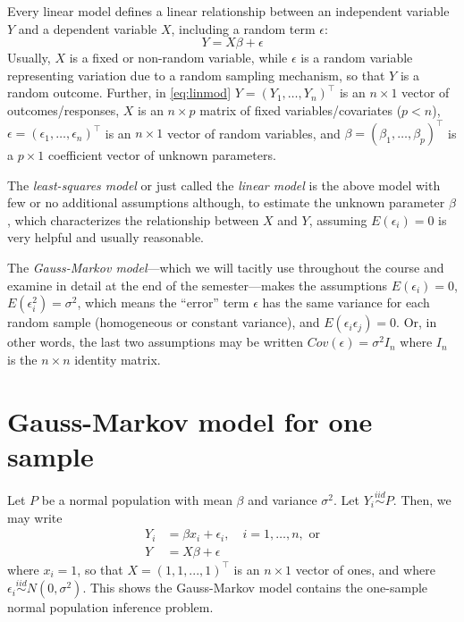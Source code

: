 \documentclass[
]{book}
\begin{document}
Every linear model defines a linear relationship between an independent variable \(Y\) and a dependent variable \(X\), including a random term \(\epsilon\):
\begin{equation}
Y = X\beta + \epsilon
  \label{eq:linmod}
\end{equation}
Usually, \(X\) is a fixed or non-random variable, while \(\epsilon\) is a random variable representing variation due to a random sampling mechanism, so that \(Y\) is a random outcome. Further, in \eqref{eq:linmod} \(Y = (Y_1, \ldots, Y_n)^\top\) is an \(n\times 1\) vector of outcomes/responses, \(X\) is an \(n\times p\) matrix of fixed variables/covariates (\(p<n\)), \(\epsilon = (\epsilon_1, \ldots, \epsilon_n)^\top\) is an \(n\times 1\) vector of random variables, and \(\beta = (\beta_1, \ldots, \beta_p)^{\top}\) is a \(p\times 1\) coefficient vector of unknown parameters.

The \emph{least-squares model} or just called the \emph{linear model} is the above model with few or no additional assumptions although, to estimate the unknown parameter \(\beta\), which characterizes the relationship between \(X\) and \(Y\), assuming \(E(\epsilon_i) = 0\) is very helpful and usually reasonable.

The \emph{Gauss-Markov model}---which we will tacitly use throughout the course and examine in detail at the end of the semester---makes the assumptions \(E(\epsilon_i) = 0\), \(E(\epsilon_i^2) = \sigma^2\), which means the ``error'' term \(\epsilon\) has the same variance for each random sample (homogeneous or constant variance), and \(E(\epsilon_i\epsilon_j)=0\). Or, in other words, the last two assumptions may be written \(Cov(\epsilon) = \sigma^2 I_{n}\) where \(I_n\) is the \(n\times n\) identity matrix.

\hypertarget{gauss-markov-model-for-one-sample}{%
\section{Gauss-Markov model for one sample}\label{gauss-markov-model-for-one-sample}}

Let \(P\) be a normal population with mean \(\beta\) and variance \(\sigma^2\). Let \(Y_i\stackrel{iid}{\sim}P\). Then, we may write
\begin{equation}
\begin{aligned}
Y_i &= \beta x_i + \epsilon_i, \quad i = 1,\ldots, n, \,\,\text{or}\\
Y &= X\beta + \epsilon
\end{aligned}
\end{equation}
where \(x_i = 1\), so that \(X = (1, 1, ..., 1)^{\top}\) is an \(n\times 1\) vector of ones, and where \(\epsilon_i\stackrel{iid}{\sim}N(0,\sigma^2)\). This shows the Gauss-Markov model contains the one-sample normal population inference problem.
\end{document}
